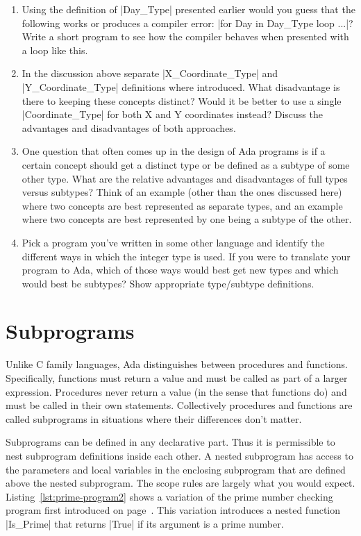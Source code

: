 \begin{enumerate}
\item Using the definition of |Day_Type| presented earlier would you guess that the following
  works or produces a compiler error: |for Day in Day_Type loop ...|? Write a short program to
  see how the compiler behaves when presented with a loop like this.

\item In the discussion above separate |X_Coordinate_Type| and |Y_Coordinate_Type| definitions
  where introduced. What disadvantage is there to keeping these concepts distinct? Would it be
  better to use a single |Coordinate_Type| for both X and Y coordinates instead? Discuss the
  advantages and disadvantages of both approaches.

\item One question that often comes up in the design of Ada programs is if a certain concept
  should get a distinct type or be defined as a subtype of some other type. What are the
  relative advantages and disadvantages of full types versus subtypes? Think of an example
  (other than the ones discussed here) where two concepts are best represented as separate
  types, and an example where two concepts are best represented by one being a subtype of the
  other.

\item Pick a program you've written in some other language and identify the different ways in
  which the integer type is used. If you were to translate your program to Ada, which of those
  ways would best get new types and which would best be subtypes? Show appropriate type/subtype
  definitions.
\end{enumerate}

\section{Subprograms}

Unlike C family languages, Ada distinguishes between procedures and functions. Specifically,
functions must return a value and must be called as part of a larger expression. Procedures
never return a value (in the sense that functions do) and must be called in their own
statements. Collectively procedures and functions are called subprograms in situations where
their differences don't matter.

Subprograms can be defined in any declarative part. Thus it is permissible to nest subprogram
definitions inside each other. A nested subprogram has access to the parameters and local
variables in the enclosing subprogram that are defined above the nested subprogram. The scope
rules are largely what you would expect. Listing~\ref{lst:prime-program2} shows a variation of
the prime number checking program first introduced on page~\pageref{lst:prime-program}. This
variation introduces a nested function |Is_Prime| that returns |True| if its argument is a prime
number.

